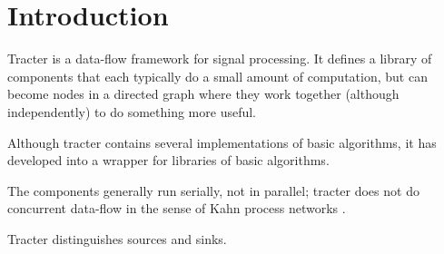 \section{Introduction}

Tracter is a data-flow framework for signal processing.  It defines a
library of components that each typically do a small amount of
computation, but can become nodes in a directed graph where they work
together (although independently) to do something more useful.

Although tracter contains several implementations of basic algorithms,
it has developed into a wrapper for libraries of basic algorithms.

The components generally run serially, not in parallel; tracter does
not do concurrent data-flow in the sense of Kahn process networks
\citep{Lee1995}.

Tracter distinguishes sources and sinks.



